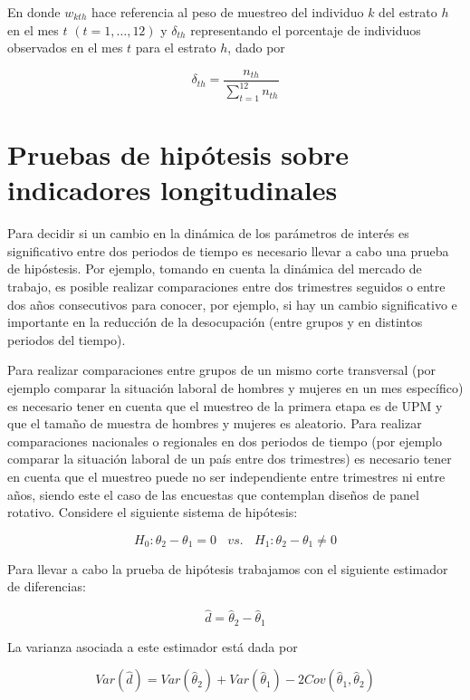 \documentclass[
  10pt,
  spanish,
]{book}
\begin{document}
En donde \(w_{kth}\) hace referencia al peso de muestreo del individuo \(k\)
del estrato \(h\) en el mes \(t\) \((t=1, \ldots, 12)\) y \(\delta_{th}\)
representando el porcentaje de individuos observados en el mes \(t\) para
el estrato \(h\), dado por

\[
\delta_{th} = \frac{n_{th}}{\sum_{t = 1} ^{12} n_{th}}
\]

\hypertarget{pruebas-de-hipuxf3tesis-sobre-indicadores-longitudinales}{%
\section{Pruebas de hipótesis sobre indicadores longitudinales}\label{pruebas-de-hipuxf3tesis-sobre-indicadores-longitudinales}}

Para decidir si un cambio en la dinámica de los parámetros de interés es
significativo entre dos periodos de tiempo es necesario llevar a cabo
una prueba de hipóstesis. Por ejemplo, tomando en cuenta la dinámica del
mercado de trabajo, es posible realizar comparaciones entre dos
trimestres seguidos o entre dos años consecutivos para conocer, por
ejemplo, si hay un cambio significativo e importante en la reducción de
la desocupación (entre grupos y en distintos periodos del tiempo).

Para realizar comparaciones entre grupos de un mismo corte transversal
(por ejemplo comparar la situación laboral de hombres y mujeres en un
mes específico) es necesario tener en cuenta que el muestreo de la
primera etapa es de UPM y que el tamaño de muestra de hombres y mujeres
es aleatorio. Para realizar comparaciones nacionales o regionales en dos
periodos de tiempo (por ejemplo comparar la situación laboral de un país
entre dos trimestres) es necesario tener en cuenta que el muestreo puede
no ser independiente entre trimestres ni entre años, siendo este el caso
de las encuestas que contemplan diseños de panel rotativo. Considere el
siguiente sistema de hipótesis:

\[
H_0: \theta_2 - \theta_1 = 0 \ \ \ \ vs. \ \ \ \ H_1: \theta_2 - \theta_1 \neq 0
\]

Para llevar a cabo la prueba de hipótesis trabajamos con el siguiente
estimador de diferencias:

\[
\hat{d} = \hat{\theta}_2 - \hat{\theta}_1
\]

La varianza asociada a este estimador está dada por

\[
Var(\hat{d}) 
= Var(\hat{\theta}_2) + Var(\hat{\theta}_1) - 2 Cov(\hat{\theta}_1, \hat{\theta}_2) 
\]
\end{document}
